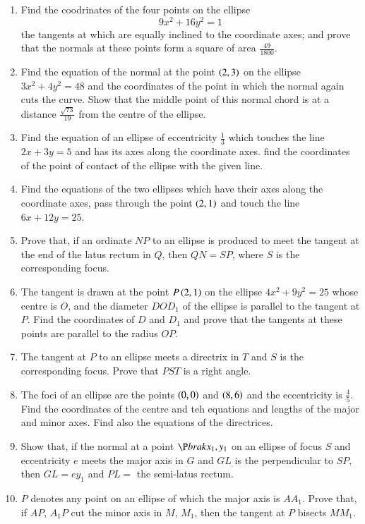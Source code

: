 \begin{enumerate}[label=\arabic*.,ref=\thesubsection.\theenumi]
\item Find the coodrinates of the four points on the ellipse
\begin{equation}
9x^2+16y^2 = 1
\end{equation}
the tangents at which are equally inclined to the coordinate axes; and prove that the normals
at these points form a square of area $\frac{49}{1800}$.
\item Find the equation of the normal at the point $\left(2,3\right)$ on the ellipse
$3x^2+4y^2 = 48$ and the coordinates of the point in which the normal again cuts the curve.
Show that the middle point of this normal chord is at a distance $\frac{\sqrt{73}}{19}$ from
the centre of the ellipse.
\item Find the equation of an ellipse of eccentricity $\frac{1}{3}$ which 
touches the line $2x+3y=5$ and has its axes along the coordinate axes.  find the coordinates
of the point of contact of the ellipse with the given line.
\item Find the equations of the two ellipses which have their axes along the coordinate axes,
pass through the point $\left(2,1\right)$ and touch the line $6x+12y= 25$.  
\item Prove that, if an ordinate $NP$ to an ellipse is produced to meet the tangent at the end
of the latus rectum in $Q$, then $QN = SP$, where $S$ is the corresponding focus.
\item The tangent is drawn at the point $P \left(2,1\right)$ on the ellipse $4x^2+9y^2 = 25$ whose
centre is $O$, and the diameter $DOD_1$ of the ellipse is parallel to the tangent at $P$.  
Find the coordinates of $D$ and $D_1$ and prove that the tangents at these points are parallel
to the radius $OP$.  
\item The tangent at $P$ to an ellipse meets a directrix in $T$ and $S$ is the corresponding
focus.  Prove that $PST$ is a right angle.
\item The foci  of an ellipse are the points $\left(0,0\right)$ and $\left(8,6\right)$ and the
eccentricity is $\frac{4}{5}$.  Find the coordinates of the centre and teh equations and
lengths of the major and minor axes.  Find also the equations of the directrices.
\item Show that, if the normal at a point $\P brak{x_1,y_1}$ on an ellipse of focus $S$
and eccentricity $e$ meets the major axis in $G$ and $GL$ is the perpendicular to $SP$,
then $GL=ey_1$ and $PL = $ the semi-latus rectum.
\item $P$ denotes any point on an ellipse of which the major axis is $AA_1$.  Prove that, if $AP$,
$A_1P$  cut the minor axis in $M$, $M_1$, then the tangent at $P$ bisects $MM_1$.
\end{enumerate}
